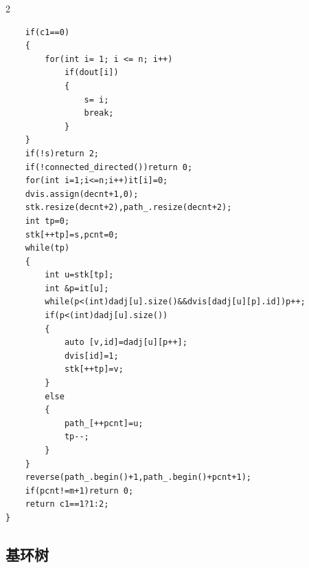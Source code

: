 \documentclass[UTF8,fontset=fandol,a4paper,twoside]{ctexart}
\begin{document}
\begin{multicols}{2}
\begin{lstlisting}
    if(c1==0)
    {
        for(int i= 1; i <= n; i++)
            if(dout[i])
            {
                s= i;
                break;
            }
    }
    if(!s)return 2;
    if(!connected_directed())return 0;
    for(int i=1;i<=n;i++)it[i]=0;
    dvis.assign(decnt+1,0);
    stk.resize(decnt+2),path_.resize(decnt+2);
    int tp=0;
    stk[++tp]=s,pcnt=0;
    while(tp)
    {
        int u=stk[tp];
        int &p=it[u];
        while(p<(int)dadj[u].size()&&dvis[dadj[u][p].id])p++;
        if(p<(int)dadj[u].size())
        {
            auto [v,id]=dadj[u][p++];
            dvis[id]=1;
            stk[++tp]=v;
        }
        else
        {
            path_[++pcnt]=u;
            tp--;
        }
    }
    reverse(path_.begin()+1,path_.begin()+pcnt+1);
    if(pcnt!=m+1)return 0;
    return c1==1?1:2;
}
\end{lstlisting}
\subsection{基环树}


\end{multicols}
\end{document}

